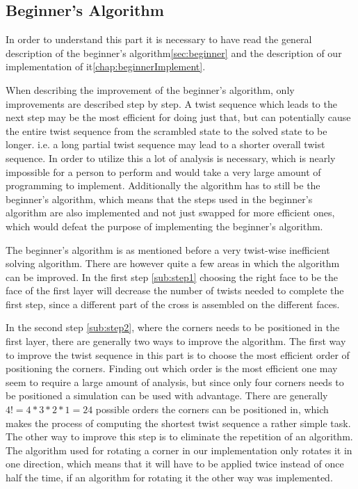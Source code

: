 

\subsection{Beginner's Algorithm}
In order to understand this part it is necessary to have read the general description of the beginner's algorithm\ref{sec:beginner} and the description of our implementation of it\ref{chap:beginnerImplement}. 

When describing the improvement of the beginner's algorithm, only improvements are described step by step. 
A twist sequence which leads to the next step may be the most efficient for doing just that, but can potentially cause the entire twist sequence from the scrambled state to the solved state to be longer. 
i.e. a long partial twist sequence may lead to a shorter overall twist sequence. In order to utilize this a lot of analysis is necessary, which is nearly impossible for a person to perform and would take a very large amount of programming to implement.
Additionally the algorithm has to still be the beginner's algorithm, which means that the steps used in the beginner's algorithm are also implemented and not just swapped for more efficient ones, which would defeat the purpose of implementing the beginner's algorithm.


The beginner's algorithm is as mentioned before a very twist-wise inefficient solving algorithm. 
There are however quite a few areas in which the algorithm can be improved.
In the first step \ref{sub:step1} choosing the right face to be the face of the first layer will decrease the number of twists needed to complete the first step, since a different part of the cross is assembled on the different faces.

In the second step \ref{sub:step2}, where the corners needs to be positioned in the first layer, there are generally two ways to improve the algorithm.
The first way to improve the twist sequence in this part is to choose the most efficient order of positioning the corners.
Finding out which order is the most efficient one may seem to require a large amount of analysis, but since only four corners needs to be positioned a simulation can be used with advantage. %
There are generally $4! = 4 * 3 * 2 * 1 = 24$ possible orders the corners can be positioned in, which makes the process of computing the shortest twist sequence a rather simple task. %
The other way to improve this step is to eliminate the repetition of an algorithm. The algorithm used for rotating a corner \cpiece{} in our implementation only rotates it in one direction, which means that it will have to be applied twice instead of once half the time, if an algorithm for rotating it the other way was implemented.


